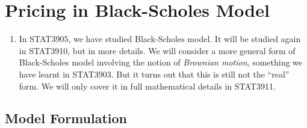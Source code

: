 \section{Pricing in Black-Scholes Model}
\label{sect:bs-model-pricing}
\begin{enumerate}
\item In STAT3905, we have studied Black-Scholes model. It will be studied
again in STAT3910, but in more details. We will consider a more general form of
Black-Scholes model involving the notion of \emph{Brownian motion}, something
we have learnt in STAT3903. But it turns out that this is still not the
``real'' form.  We will only cover it in full mathematical details in STAT3911.
\end{enumerate}
\subsection{Model Formulation}
